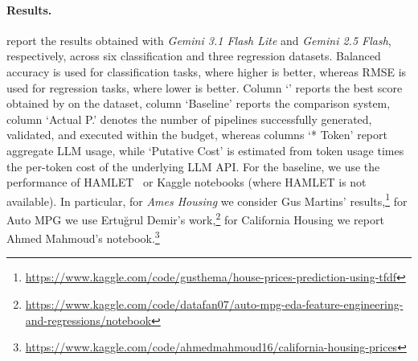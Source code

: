\documentclass[runningheads]{llncs}
\begin{document}

\paragraph{Results.}
\label{subsec:results}







 report
the results obtained with \textit{Gemini 3.1 Flash Lite} and \textit{Gemini 2.5 Flash},
respectively,
across six classification and three regression datasets.
%
Balanced accuracy is used for classification tasks, where higher is better, 
whereas RMSE is used for regression tasks, where lower is better. 
%
Column `\ourapproach{}' reports the best score obtained by \ourapproach{} on the dataset, 
column `Baseline' reports the comparison system, 
column `Actual P.' denotes the number of pipelines successfully generated, validated, and executed within the budget, 
whereas columns `* Token' report aggregate \ac{LLM} usage, 
while `Putative Cost' is estimated from token usage times the per-token cost of the underlying \ac{LLM} \ac{API}.
%
For the baseline,
we use the performance of HAMLET~\cite{FranciaGP23} or Kaggle notebooks (where HAMLET is not available).
%
In particular,
for \textit{Ames Housing} we consider Gus Martins' results,\footnote{\url{https://www.kaggle.com/code/gusthema/house-prices-prediction-using-tfdf}}
for Auto MPG we use Ertu\u{g}rul Demir's work,\footnote{\url{https://www.kaggle.com/code/datafan07/auto-mpg-eda-feature-engineering-and-regressions/notebook}}
for California Housing we report Ahmed Mahmoud's notebook.\footnote{\url{https://www.kaggle.com/code/ahmedmahmoud16/california-housing-prices}}
\end{document}

